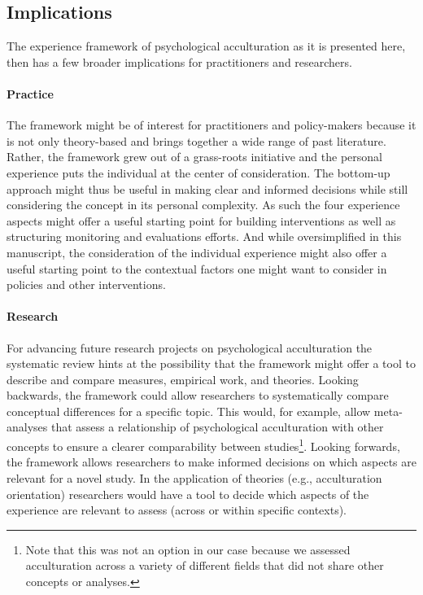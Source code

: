 \documentclass[man, 12pt, a4paper]{apa7}
\begin{document}
\subsection{Implications}
The experience framework of psychological acculturation as it is presented here, then has a few broader implications for practitioners and researchers. 

\paragraph{Practice} The framework might be of interest for practitioners and policy-makers because it is not only theory-based and brings together a wide range of past literature. Rather, the framework grew out of a grass-roots initiative and the personal experience puts the individual at the center of consideration. The bottom-up approach might thus be useful in making clear and informed decisions while still considering the concept in its personal complexity. As such the four experience aspects might offer a useful starting point for building interventions as well as structuring monitoring and evaluations efforts. And while oversimplified in this manuscript, the consideration of the individual experience might also offer a useful starting point to the contextual factors one might want to consider in policies and other interventions.

\paragraph{Research} For advancing future research projects on psychological acculturation the systematic review hints at the possibility that the framework might offer a tool to describe and compare measures, empirical work, and theories. Looking backwards, the framework could allow researchers to systematically compare conceptual differences for a specific topic. This would, for example, allow meta-analyses that assess a relationship of psychological acculturation with other concepts to ensure a clearer comparability between studies\footnote{Note that this was not an option in our case because we assessed acculturation across a variety of different fields that did not share other concepts or analyses.}. Looking forwards, the framework allows researchers to make informed decisions on which aspects are relevant for a novel study. In the application of theories (e.g., acculturation orientation) researchers would have a tool to decide which aspects of the experience are relevant to assess (across or within specific contexts).
\end{document}
